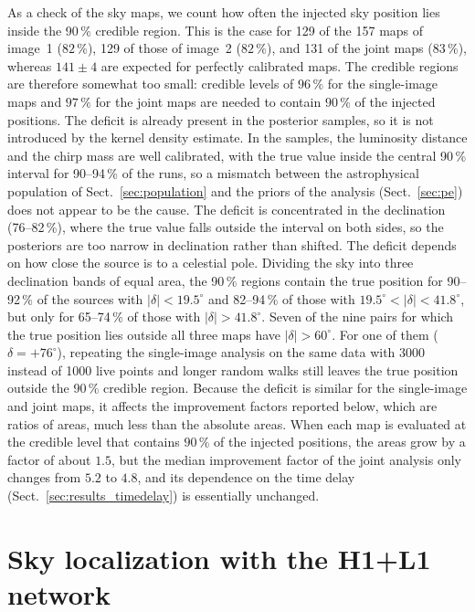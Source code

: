 \documentclass{aa}
\begin{document}
As a check of the sky maps, we count how often the injected sky position
lies inside the 90\,\% credible region. This is the case for 129 of the 157
maps of image~1 ($82\,\%$), 129 of those of image~2 ($82\,\%$), and 131 of
the joint maps ($83\,\%$), whereas $141 \pm 4$ are expected for perfectly
calibrated maps. The credible regions are therefore somewhat too small:
credible levels of $96\,\%$ for the single-image maps and $97\,\%$ for
the joint maps are needed to contain $90\,\%$ of the injected positions. The deficit is already present in the posterior
samples, so it is not introduced by the kernel density estimate. In the
samples, the luminosity distance and the chirp mass are well calibrated,
with the true value inside the central 90\,\% interval for 90--94\,\% of
the runs, so a mismatch between the astrophysical population of
Sect.~\ref{sec:population} and the priors of the analysis
(Sect.~\ref{sec:pe}) does not appear to be the cause. The deficit is
concentrated in the declination (76--82\,\%), where the true value falls
outside the interval on both sides, so the posteriors are too narrow in
declination rather than shifted. The deficit depends on how close the
source is to a celestial pole. Dividing the sky into three declination
bands of equal area, the 90\,\% regions contain the true position for
90--92\,\% of the sources with $|\delta| < 19.5^\circ$ and 82--94\,\% of
those with $19.5^\circ < |\delta| < 41.8^\circ$, but only for 65--74\,\%
of those with $|\delta| > 41.8^\circ$. Seven of the nine pairs for which
the true position lies outside all three maps have $|\delta| > 60^\circ$.
For one of them ($\delta = +76^\circ$), repeating the single-image
analysis on the same data with 3000 instead of 1000 live points and longer
random walks still leaves the true position outside the 90\,\% credible
region.
Because the deficit is similar for the single-image and joint
maps, it affects the improvement factors reported below, which are ratios
of areas, much less than the absolute areas. When each map is evaluated
at the credible level that contains $90\,\%$ of the injected positions,
the areas grow by a factor of about $1.5$, but the median improvement
factor of the joint analysis only changes from $5.2$ to $4.8$, and its
dependence on the time delay (Sect.~\ref{sec:results_timedelay}) is
essentially unchanged.

\section{Sky localization with the H1+L1 network}
\label{sec:results_hl}
\end{document}
